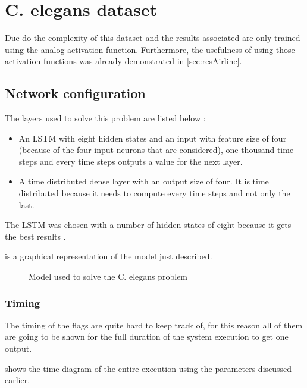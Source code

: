 \section{\acs{C. elegans} dataset}
\label{sec:resCelegans}

Due do the complexity of this dataset and the results associated are only trained using the analog activation function. Furthermore, the usefulness of using those activation functions was already demonstrated in \cref{sec:resAirline}.

\subsection{Network configuration}

The layers used to solve this problem are listed below :

\begin{itemize}
  \item An \ac{LSTM} with eight hidden states and an input with feature size of four (because of the four input neurons that are considered), one thousand time steps and every time steps outputs a value for the next layer.
  \item A time distributed dense layer with an output size of four. It is time distributed because it needs to compute every time steps and not only the last.
\end{itemize}

The \ac{LSTM} was chosen with a number of hidden states of eight because it gets the best results \cite{celegans}.

 is a graphical representation of the model just described.

\begin{figure}[H]
  \centering
  
  \caption{Model used to solve the \ac{C. elegans} problem}
  \label{fig:celegansModel}
\end{figure}

\subsubsection{Timing}

The timing of the flags are quite hard to keep track of, for this reason all of them are going to be shown for the full duration of the system execution to get one output.

 shows the time diagram of the entire execution using the parameters discussed earlier.


